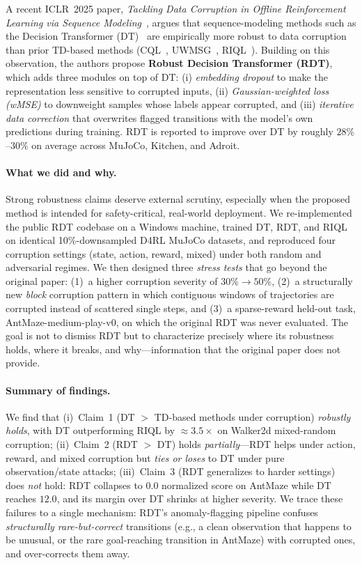 \documentclass[10pt,twocolumn,letterpaper]{article}
\begin{document}
A recent ICLR~2025 paper, \emph{Tackling Data Corruption in Offline
Reinforcement Learning via Sequence Modeling}~\cite{xu2025rdt}, argues that
sequence-modeling methods such as the Decision Transformer
(DT)~\cite{chen2021dt} are empirically more robust to data corruption than
prior TD-based methods (CQL~\cite{kumar2020cql}, UWMSG~\cite{ye2024uwmsg},
RIQL~\cite{yang2024riql}). Building on this observation, the authors propose
\textbf{Robust Decision Transformer (RDT)}, which adds three modules on top
of DT: (i) \emph{embedding dropout} to make the representation less sensitive
to corrupted inputs, (ii) \emph{Gaussian-weighted loss (wMSE)} to downweight
samples whose labels appear corrupted, and (iii) \emph{iterative data
correction} that overwrites flagged transitions with the model's own
predictions during training. RDT is reported to improve over DT by roughly
$28\%$--$30\%$ on average across MuJoCo, Kitchen, and Adroit.

\paragraph{What we did and why.}
Strong robustness claims deserve external scrutiny, especially when the
proposed method is intended for safety-critical, real-world deployment.
We re-implemented the public RDT codebase on a Windows machine, trained
DT, RDT, and RIQL on identical 10\%-downsampled D4RL MuJoCo datasets, and
reproduced four corruption settings (state, action, reward, mixed) under
both random and adversarial regimes. We then designed three
\emph{stress tests} that go beyond the original paper:
(1)~a higher corruption severity of $30\% \to 50\%$,
(2)~a structurally new \emph{block} corruption pattern in which contiguous
windows of trajectories are corrupted instead of scattered single steps, and
(3)~a sparse-reward held-out task, AntMaze-medium-play-v0, on which the
original RDT was never evaluated. The goal is not to dismiss RDT but to
characterize precisely where its robustness holds, where it breaks, and
why---information that the original paper does not provide.

\paragraph{Summary of findings.}
We find that (i)~Claim~1 (DT $>$ TD-based methods under corruption)
\emph{robustly holds}, with DT outperforming RIQL by $\approx\!3.5\times$
on Walker2d mixed-random corruption; (ii)~Claim~2 (RDT $>$ DT) holds
\emph{partially}---RDT helps under action, reward, and mixed corruption but
\emph{ties or loses} to DT under pure observation/state attacks;
(iii)~Claim~3 (RDT generalizes to harder settings) does \emph{not} hold:
RDT collapses to $0.0$ normalized score on AntMaze while DT reaches $12.0$,
and its margin over DT shrinks at higher severity. We trace these failures
to a single mechanism: RDT's anomaly-flagging pipeline confuses
\emph{structurally rare-but-correct} transitions (e.g., a clean
observation that happens to be unusual, or the rare goal-reaching
transition in AntMaze) with corrupted ones, and over-corrects them away.
\end{document}
